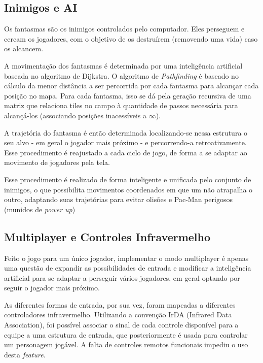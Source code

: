 \documentclass[12pt, a4paper, twocolumn]{article}
\begin{document}


\subsection{Inimigos e AI}

Os fantasmas são os inimigos controlados pelo computador. Eles perseguem e cercam os jogadores, com o objetivo de os destruírem (removendo uma vida) caso os alcancem.

A movimentação dos fantasmas é determinada por uma inteligência artificial baseada no algoritmo de Dijkstra. O algoritmo de \textit{Pathfinding} é baseado no cálculo da menor distância a ser percorrida por cada fantasma para alcançar cada posição no mapa. Para cada fantasma, isso se dá pela geração recursiva de uma matriz que relaciona tiles no campo à quantidade de passos necessária para alcançá-los (associando  posições inacessíveis a $\infty$).

A trajetória do fantasma é então determinada localizando-se nessa estrutura o seu alvo - em geral o jogador mais próximo - e percorrendo-a retroativamente. Esse procedimento é reajustado a cada ciclo de jogo, de forma a se adaptar ao movimento de jogadores pela tela.

Esse procedimento é realizado de forma inteligente e unificada pelo conjunto de inimigos, o que possibilita movimentos coordenados em que um não atrapalha o outro, adaptando suas trajetórias para evitar olisões e Pac-Man perigosos (munidos de \textit{power up})



\subsection{Multiplayer e Controles Infravermelho}

Feito o jogo para um único jogador, implementar o modo multiplayer é apenas uma questão de expandir as possibilidades de entrada e modificar a inteligência artificial para se adaptar a perseguir vários jogadores, em geral optando por seguir o jogador mais próximo.

As diferentes formas de entrada, por sua vez, foram mapeadas a diferentes controladores infravermelho. Utilizando a convenção IrDA (Infrared Data Association), foi possível associar o sinal de cada controle disponível para a equipe a uma estrutura de entrada, que posteriormente é usada para controlar um personagem jogável. A falta de controles remotos funcionais impediu o uso desta \textit{feature}.
\end{document}
